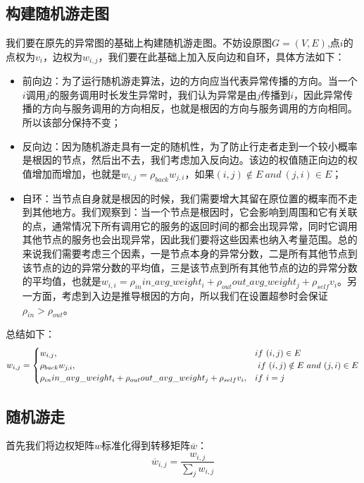 \subsection{构建随机游走图}
我们要在原先的异常图的基础上构建随机游走图。不妨设原图$G=(V,E)$,点$i$的点权为$v_i$，边权为$w_{i,j}$，我们要在此基础上加入反向边和自环，具体方法如下：
\begin{itemize}
  \item 前向边：为了运行随机游走算法，边的方向应当代表异常传播的方向。当一个$i$调用$j$的服务调用时长发生异常时，我们认为异常是由$j$传播到$i$，因此异常传播的方向与服务调用的方向相反，也就是根因的方向与服务调用的方向相同。所以该部分保持不变；
  \item 反向边：因为随机游走具有一定的随机性，为了防止行走者走到一个较小概率是根因的节点，然后出不去，我们考虑加入反向边。该边的权值随正向边的权值增加而增加，也就是$w_{i,j} = \rho_{back} w_{j,i}$，如果$(i,j) \notin E\ and\  (j,i) \in E$；
  \item 自环：当节点自身就是根因的时候，我们需要增大其留在原位置的概率而不走到其他地方。我们观察到：当一个节点是根因时，它会影响到周围和它有关联的点，通常情况下所有调用它的服务的返回时间的都会出现异常，同时它调用其他节点的服务也会出现异常，因此我们要将这些因素也纳入考量范围。总的来说我们需要考虑三个因素，一是节点本身的异常分数，二是所有其他节点到该节点的边的异常分数的平均值，三是该节点到所有其他节点的边的异常分数的平均值，也就是$w_{i,i} = \rho_{in} in\_avg\_weight_{i} + \rho_{out} out\_avg\_weight_{j}+ \rho_{self}  v_i$。另一方面，考虑到入边是推导根因的方向，所以我们在设置超参时会保证$\rho_{in}>\rho_{out}$。
\end{itemize}

总结如下：
\begin{equation*}
w_{i,j} = \begin{cases} w_{i,j}, & if\ (i,j) \in E \cr \rho_{back} w_{j,i}, &\ if\ (i,j) \notin E\ and\  (j,i) \in E \cr \rho_{in} in\_avg\_weight_{i} + \rho_{out} out\_avg\_weight_{j}+ \rho_{self}  v_i, & if\ i=j \end{cases}
\end{equation*}

\subsection{随机游走}
首先我们将边权矩阵$w$标准化得到转移矩阵$\overline{w}$：
\begin{equation*}
  \overline{w}_{i,j} = \frac{w_{i,j}}{\sum_jw_{i,j}}
\end{equation*}

